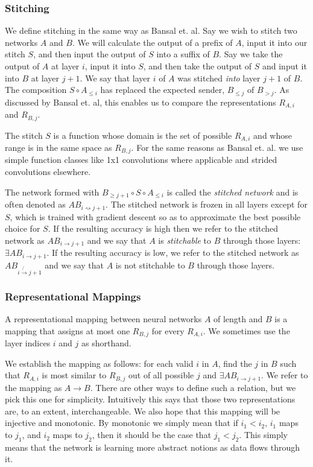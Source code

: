 \documentclass{article} %
\begin{document}
\subsubsection*{Stitching}
We define stitching in the same way as Bansal et. al. 
Say we wish to stitch two networks \(A\) and \(B\).
We will calculate the output of a prefix of \(A\),
input it into our stitch \(S\), and then input the output
of \(S\) into a suffix of \(B\). Say we take the
output of \(A\) at layer \(i\), input it into \(S\),
and then take the output of \(S\) and input it into
\(B\) at layer \(j+1\). We say that layer \(i\) of
\(A\) was stitched \emph{into} layer \(j+1\) of \(B\).
The composition \(S \circ A_{\leq i}\) has replaced
the expected sender, \(B_{\leq j}\) of \(B_{>j}\).
As discussed by Bansal et. al, this enables us to compare
the representations \(R_{A,i}\) and \(R_{B,j}\).

The stitch \(S\) is a function whose domain is the set of possible \(R_{A,i}\)
and whose range is in the same space as \(R_{B,j}\). For the same reasons as Bansal et. al.
we use simple function classes like 1x1 convolutions where applicable and strided convolutions
elsewhere.

The network formed with \(B_{\geq j+1} \circ S \circ A_{\leq i}\) is called the 
\emph{stitched network} and is often denoted as \(AB_{i \rightsquigarrow j+1}\). The stitched 
network is frozen in all layers except for \(S\), which is trained with gradient descent
so as to approximate the best possible choice for \(S\). If the resulting accuracy
is high then we refer to the stitched network as \(AB_{i \rightarrow j+1}\) and we say
that \(A\) is \emph{stitchable} to \(B\) through those layers: \(\exists AB_{i \rightarrow j+1}\).
If the resulting accuracy is low, we refer to the stitched network as \(AB_{i \not{\rightarrow} j+1}\)
and we say that \(A\) is not stitchable to \(B\) through those layers.

\subsubsection*{Representational Mappings}
A representational mapping between neural networks \(A\) of length and \(B\) is a mapping that assigns
at most one \(R_{B,j}\) for every \(R_{A,i}\). We sometimes use the layer indices \(i\) and \(j\)
as shorthand.

We establish the mapping as follows: for each valid \(i\) in \(A\), find the \(j\) in \(B\)
such that \(R_{A,i}\) is most similar to \(R_{B,j}\) out of all possible \(j\) and
\(\exists AB_{i \rightarrow j+1}\). We refer to the mapping as \(A \rightarrow B\). There are
other ways to define such a relation, but we pick this one for simplicity.
Intuitively this says that those two representations are, to an extent, interchangeable.
We also hope that this mapping will be injective and monotonic.
By monotonic we simply mean that if \(i_{1} < i_{2}\), \(i_{1}\) maps to \(j_{1}\),
and \(i_{2}\) maps to \(j_{2}\), then it should be the case that \(j_{1} < j_{2}\). This simply
means that the network is learning more abstract notions as data flows through it.
\end{document}
